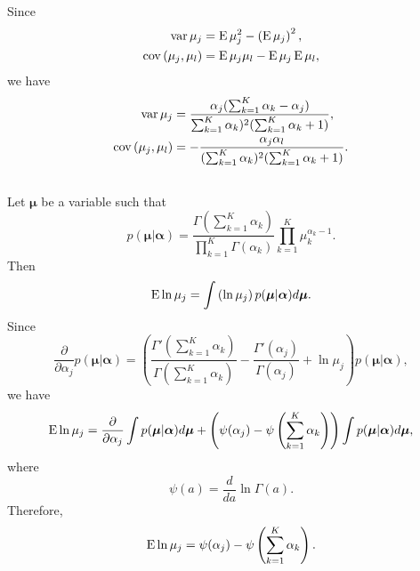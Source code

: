 %
Since
%
\begin{equation}
\begin{aligned}
\operatorname{var} \mu_j 
&= 
\operatorname{E} \mu_j ^ 2 
- 
\left( 
	\operatorname{E} \mu_j 
\right) ^ 2, 
\\
\operatorname{cov} 
\left( 
	\mu_j, 
	\mu_l 
\right) 
&= 
\operatorname{E} \mu_j \mu_l 
- 
\operatorname{E} \mu_j 
\operatorname{E} \mu_l,
\end{aligned}
\end{equation}
%
we have
%
\begin{equation}
\begin{aligned}
\operatorname{var} \mu_j 
&= 
\frac
{\alpha_j (\sum_{k = 1}^{K} \alpha_k - \alpha_j)}
{\sum_{k = 1}^{K} \alpha_k) ^ 2 (\sum_{k = 1}^{K} \alpha_k + 1)}, 
\\
\operatorname{cov} \left( \mu_j, \mu_l \right) 
&= 
- 
\frac
{\alpha_j \alpha_l}
{(\sum_{k = 1}^{K} \alpha_k) ^ 2 (\sum_{k = 1}^{K} \alpha_k + 1)}.
\end{aligned}
\end{equation}
%


\subsection{}
\label{2.11}
Let $\bm{\mu}$ be a variable such that
%
\begin{equation}
p(\bm{\mu} | \bm{\alpha}) 
= 
\frac
{\Gamma \left( \sum_{k = 1}^{K} \alpha_k \right)}
{\prod_{k = 1}^{K} \Gamma(\alpha_k)} 
\prod_{k = 1}^{K} 
\mu_k ^ {\alpha_k - 1}.
\end{equation}
%
Then
%
\begin{equation}
\operatorname{E} \ln \mu_j 
= 
\int 
\left( 
	\ln \mu_j 
\right) 
p(\bm{\mu} | \bm{\alpha}) 
d\bm{\mu}.
\end{equation}
%
Since
%
\begin{equation}
\frac{\partial}{\partial \alpha_j} 
p(\bm{\mu} | \bm{\alpha}) 
= 
\left( 
	\frac
	{\Gamma' \left( \sum_{k = 1}^{K} \alpha_k \right)}
	{\Gamma \left( \sum_{k = 1}^{K} \alpha_k \right)} 
	- 
	\frac
	{\Gamma'(\alpha_j)}
	{\Gamma(\alpha_j)} + \ln \mu_j 
\right) 
p(\bm{\mu} | \bm{\alpha}),
\end{equation}
%
we have
%
\begin{equation}
\operatorname{E} \ln \mu_j 
= 
\frac{\partial}{\partial \alpha_j} 
\int 
p(\bm{\mu} | \bm{\alpha}) 
d\bm{\mu} 
+ 
\left( 
	\psi (\alpha_j) 
	- 
	\psi 
	\left( 
		\sum_{k = 1}^{K} \alpha_k 
	\right) 
\right) 
\int 
p(\bm{\mu} | \bm{\alpha}) 
d\bm{\mu},
\end{equation}
%
where
%
\begin{equation}
\psi(a) 
= 
\frac{d}{da} \ln \Gamma(a).
\end{equation}
%
Therefore,
%
\begin{equation}
\operatorname{E} \ln \mu_j 
= 
\psi(\alpha_j) 
- 
\psi 
\left( 
	\sum_{k = 1}^{K} \alpha_k 
\right).
\end{equation}
%


